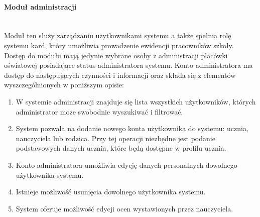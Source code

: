 \documentclass{article}
\begin{document}
\paragraph{Moduł administracji} \mbox{}\\
Moduł ten służy zarządzaniu użytkownikami systemu a także spełnia rolę systemu kard, który umożliwia prowadzenie ewidencji pracowników szkoły.\\Dostęp do modułu mają jedynie wybrane osoby z administracji placówki oświatowej posiadające status administratora systemu. Konto administratora ma dostęp do następujących czynności i informacji oraz składa się z elementów wyszczególnionych w poniższym opisie:
\begin{enumerate}
\item W systemie administracji znajduje się lista wszystkich użytkowników, których administrator może swobodnie wyszukiwać i filtrować.
\item System pozwala na dodanie nowego konta użytkownika do systemu: ucznia, nauczyciela lub rodzica. Przy tej operacji niezbędne jest podanie podstawowych danych ucznia, które będą dostępne w profilu ucznia.
\item Konto administratora umożliwia edycję danych personalnych dowolnego użytkownika systemu.
\item Istnieje możliwość usunięcia dowolnego użytkownika systemu.
\item System oferuje możliwość edycji ocen wystawionych przez nauczyciela.


\end{enumerate}
\end{document}
